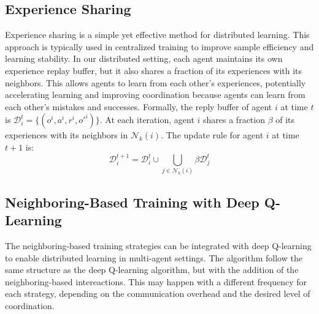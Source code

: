 \documentclass[sigconf]{acmart}
\begin{document}
\subsection{Experience Sharing}
Experience sharing is a simple yet effective method for distributed learning.
This approach is typically used in centralized training to improve sample efficiency and learning stability.
In our distributed setting, each agent maintains its own experience replay buffer, but it also shares a fraction of its experiences with its neighbors.
This allows agents to learn from each other's experiences, potentially accelerating learning and improving coordination because agents can learn from each other's mistakes and successes.
%
Formally, the reply buffer of agent $i$ at time $t$ is $\mathcal{D}^t_i = \{(o^i, a^i, r^i, o'^i)\}$.
At each iteration, agent $i$ shares a fraction $\beta$ of its experiences with its neighbors in $\mathcal{N}_k(i)$.
The update rule for agent $i$ at time $t+1$ is:
\begin{equation}
  \mathcal{D}^{t+1}_i = \mathcal{D}^t_i \cup \bigcup_{j \in \mathcal{N}_k(i)} \beta \mathcal{D}^t_j
\end{equation}
\subsection{Neighboring-Based Training with Deep Q-Learning}
The neighboring-based training strategies can be integrated with deep Q-learning to enable distributed learning in multi-agent settings.
%
The algorithm follow the same structure as the deep Q-learning algorithm, but with the addition of the neighboring-based intereactions.
%
This may happen with a different frequency for each strategy, depending on the communication overhead and the desired level of coordination.
\end{document}
